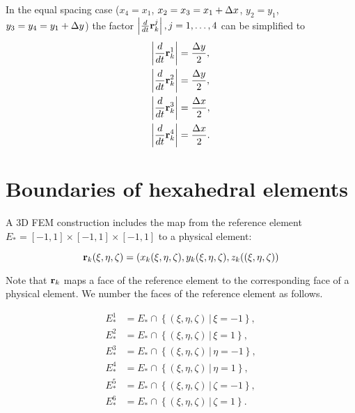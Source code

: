 \documentclass[11pt]{article}
\begin{document}
In the equal spacing case ($x_{4} = x_{1}$, $x_{2} = x_{3} = x_{1} +
\Delta x$, $y_{2} = y_{1}$, $y_{3} = y_{4} = y_{1} + \Delta y$) the factor
$\left| \frac{d}{dt}\mathbf{r}_{k}^{j}\right|, j=1,\dots,4$ can be simplified to
\begin{align*}
\left| \frac{d}{dt}\mathbf{r}_{k}^{1}\right|  & = \frac{\Delta y}{2}, \\
\left| \frac{d}{dt}\mathbf{r}_{k}^{2}\right|  & = \frac{\Delta y}{2}, \\
\left| \frac{d}{dt}\mathbf{r}_{k}^{3}\right|  & = \frac{\Delta x}{2}, \\
\left| \frac{d}{dt}\mathbf{r}_{k}^{4}\right|  & = \frac{\Delta x}{2}. \\
\end{align*}

\section{Boundaries of hexahedral elements}
\label{sec-4}
\renewcommand{\Tq}{\Fr{\R}(s_{q}, t_{q})}
\renewcommand{\Tkq}{\Fk{\R}(s_{q}, t_{q})}

A 3D FEM construction includes the map from the reference element
$E_{*} = [-1, 1] \times [-1,1] \times [-1,1]$ to a physical element:

\begin{equation}
\label{eq:22}
\mathbf{r}_{k}(\xi,\eta,\zeta) = \left( x_{k}(\xi,\eta,\zeta), y_{k}(\xi,\eta,\zeta), z_{k}((\xi,\eta,\zeta) \right)
\end{equation}

Note that $\mathbf{r}_{k}$ maps a face of the reference element to the
corresponding face of a physical element. We number the faces of the
reference element as follows.

\begin{equation}
\label{eq:23}
\begin{aligned}
E_{*}^{1} &=  E_{*} \cap \left \{ (\xi, \eta, \zeta)\, |\, \xi = -1 \right \},\\
E_{*}^{2} &=  E_{*} \cap \left \{ (\xi, \eta, \zeta)\, |\, \xi = 1  \right \},\\
E_{*}^{3} &=  E_{*} \cap \left \{ (\xi, \eta, \zeta)\, |\, \eta = -1 \right \},\\
E_{*}^{4} &=  E_{*} \cap \left \{ (\xi, \eta, \zeta)\, |\, \eta = 1  \right \},\\
E_{*}^{5} &=  E_{*} \cap \left \{ (\xi, \eta, \zeta)\, |\, \zeta = -1 \right \},\\
E_{*}^{6} &=  E_{*} \cap \left \{ (\xi, \eta, \zeta)\, |\, \zeta = 1  \right \}.
\end{aligned}
\end{equation}
\end{document}

